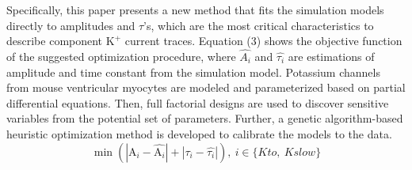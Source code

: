 \documentclass[journal]{IEEEtran}
\begin{document}
Specifically, this paper presents a new method that fits the simulation models directly to amplitudes and $\tau$'s, which are the most critical characteristics to describe component $\text{K}^{+}$ current traces. Equation (3) shows the objective function of the suggested optimization procedure, where $\hat{A_i}$ and $\hat{\tau_i}$ are estimations of amplitude and time constant from the simulation model. Potassium channels from mouse ventricular myocytes are modeled and parameterized based on partial differential equations. Then, full factorial designs are used to discover sensitive variables from the potential set of parameters. Further, a genetic algorithm-based heuristic optimization method is developed to calibrate the models to the data.
\begin{equation}
    \min (|\text{A}_i - \hat{\text{A}_i}| + |\tau_i - \hat{\tau_i}|), \ i \in \{Kto,\ Kslow\}
\end{equation}
\end{document}
